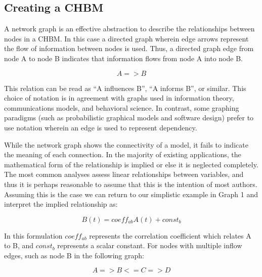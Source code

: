 \documentclass[runningheads,a4paper]{llncs}
\begin{document}
\subsection{Creating a CHBM}
A network graph is an effective abstraction to describe the relationships between nodes in a CHBM.
In this case a directed graph wherein edge arrows represent the flow of information between nodes is used.
Thus, a directed graph edge from node A to node B indicates that information flows from node A into node B. 

\begin{equation}
  A => B
  \label{eq:simplest-sample}
\end{equation}

This relation can be read as ``A influences B'', ``A informs B'', or similar.  
This choice of notation is in agreement with graphs used in information theory, communications models, and behavioral science.
In contrast, some graphing paradigms (such as probabilistic graphical models and software design) prefer to use notation wherein an edge is used to represent dependency.

While the network graph shows the connectivity of a model, it fails to indicate the meaning of each connection.
In the majority of existing applications, the mathematical form of the relationship is implied or else it is neglected completely.
The most common analyses assess linear relationships between variables, and thus it is perhaps reasonable to assume that this is the intention of most authors.
Assuming this is the case we can return to our simplistic example in Graph 1 and interpret the implied relationship as:

\begin{equation}
    B(t) = coeff_{ab}A(t) + const_b
    \label{eq:linear-formula}
\end{equation}

In this formulation $coeff_{ab}$ represents the correlation coefficient which relates A to B, and $const_b$ represents a scalar constant.
For nodes with multiple inflow edges, such as node B in the following graph:

\begin{equation}
    A => B <= C => D
    \label{eq:less-simple-graph}
\end{equation}
\end{document}
